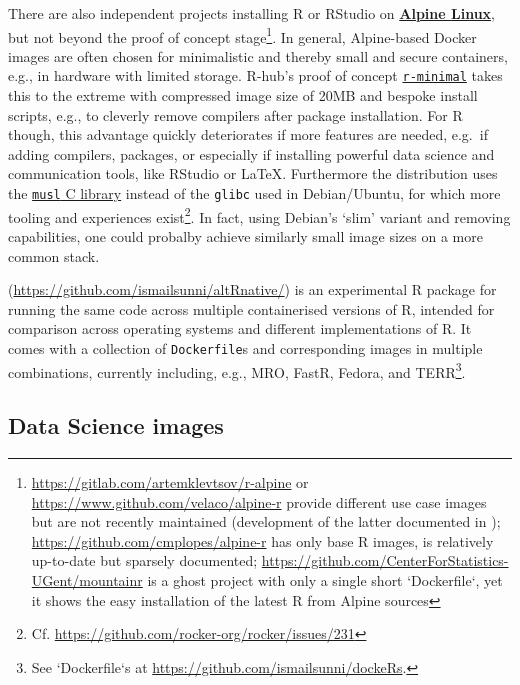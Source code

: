 There are also independent projects installing R or RStudio on
\href{https://www.alpinelinux.org/}{\textbf{Alpine Linux}}, but not
beyond the proof of concept
stage\footnote{\href{https://gitlab.com/artemklevtsov/r-alpine}{https://gitlab.com/artemklevtsov/r-alpine} or \href{https://www.github.com/velaco/alpine-r}{https://www.github.com/velaco/alpine-r} provide different use case images but are not recently maintained (development of the latter documented in \citet{ratesic_building_2018}); \href{https://github.com/cmplopes/alpine-r}{https://github.com/cmplopes/alpine-r} has only base R images, is relatively up-to-date but sparsely documented; \href{https://github.com/CenterForStatistics-UGent/mountainr}{https://github.com/CenterForStatistics-UGent/mountainr} is a ghost project with only a single short `Dockerfile`, yet it shows the easy installation of the latest R from Alpine sources}.
In general, Alpine-based Docker images are often chosen for minimalistic
and thereby small and secure containers, e.g., in hardware with limited
storage. R-hub's proof of concept
\href{https://github.com/r-hub/r-minimal}{\texttt{r-minimal}} takes this
to the extreme with compressed image size of 20MB and bespoke install
scripts, e.g., to cleverly remove compilers after package installation.
For R though, this advantage quickly deteriorates if more features are
needed, e.g.~if adding compilers, packages, or especially if installing
powerful data science and communication tools, like RStudio or LaTeX.
Furthermore the distribution uses the
\href{https://www.musl-libc.org/}{\texttt{musl} C library} instead of
the \texttt{glibc} used in Debian/Ubuntu, for which more tooling and
experiences
exist\footnote{Cf. \href{https://github.com/rocker-org/rocker/issues/231}{https://github.com/rocker-org/rocker/issues/231}}.
In fact, using Debian's `slim' variant and removing capabilities, one
could probalby achieve similarly small image sizes on a more common
stack.

\textbf{}
(\url{https://github.com/ismailsunni/altRnative/}) is an experimental R
package for running the same code across multiple containerised versions
of R, intended for comparison across operating systems and different
implementations of R. It comes with a collection of \texttt{Dockerfile}s
and corresponding images in multiple combinations, currently including,
e.g., MRO, FastR, Fedora, and
TERR\footnote{See `Dockerfile`s at \href{https://github.com/ismailsunni/dockeRs}{https://github.com/ismailsunni/dockeRs}.}.

\hypertarget{data-science-images}{%
\subsection{Data Science images}\label{data-science-images}}

